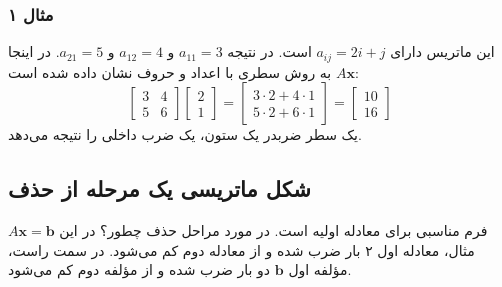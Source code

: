 \documentclass[12pt, a4paper]{book}
\begin{document}
	\subsubsection*{مثال ۱}
	این ماتریس دارای $a_{ij} = 2i+j$ است. در نتیجه $a_{11}=3$ و $a_{12}=4$ و $a_{21}=5$.
	در اینجا $A\mathbf{x}$ به روش سطری با اعداد و حروف نشان داده شده است:
	\[
	\begin{bmatrix} 3 & 4 \\ 5 & 6 \end{bmatrix}
	\begin{bmatrix} 2 \\ 1 \end{bmatrix}
	=
	\begin{bmatrix} 3 \cdot 2 + 4 \cdot 1 \\ 5 \cdot 2 + 6 \cdot 1 \end{bmatrix}
	=
	\begin{bmatrix} 10 \\ 16 \end{bmatrix}
	\]
	یک سطر ضربدر یک ستون، یک ضرب داخلی را نتیجه می‌دهد.
	
	\subsection*{شکل ماتریسی یک مرحله از حذف}
	$A\mathbf{x}=\mathbf{b}$ فرم مناسبی برای معادله اولیه است. در مورد مراحل حذف چطور؟ در این مثال، معادله اول ۲ بار ضرب شده و از معادله دوم کم می‌شود. در سمت راست، مؤلفه اول $\mathbf{b}$ دو بار ضرب شده و از مؤلفه دوم کم می‌شود.
	
\end{document}
